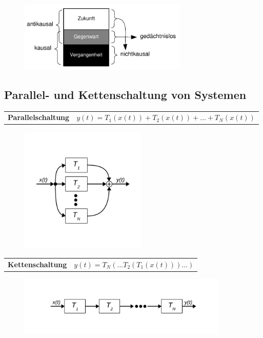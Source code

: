 \documentclass[10pt,a4paper]{article}
\begin{document}
\begin{figure}[H]
	\centering
	\includegraphics[width=8cm]{img/ZeiteigenschaftenVonSystemen}
\end{figure}

\subsection*{Parallel- und Kettenschaltung von Systemen}
\begin{tabular}{r p{12cm}}
	\textbf{Parallelschaltung} & $y(t)=T_1(x(t))+T_2(x(t))+...+T_N(x(t))$\\
\end{tabular}
\begin{figure}[H]
	\centering
	\includegraphics[width=6cm]{img/Systemparallelschaltung}
\end{figure}
\begin{tabular}{r p{12cm}}
	\textbf{Kettenschaltung} & $y(t)=T_N(...T_2(T_1(x(t)))...)$\\
\end{tabular}
\begin{figure}[H]
	\centering
	\includegraphics[width=10cm]{img/Systemkettenschaltung}
\end{figure}
\end{document}

